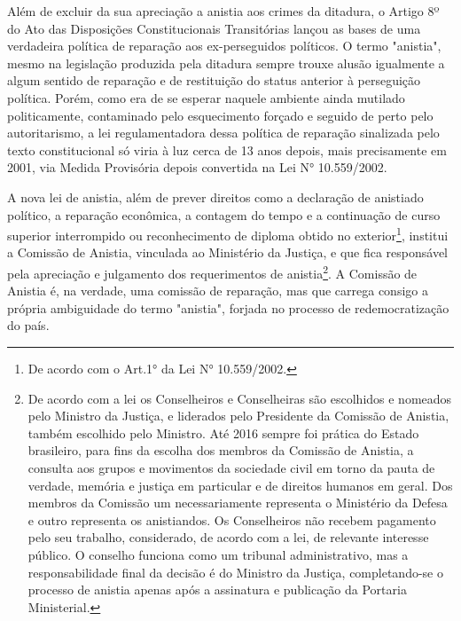 Além de excluir da sua apreciação a anistia aos crimes da ditadura, o
Artigo 8º do Ato das Disposições Constitucionais Transitórias lançou as
bases de uma verdadeira política de reparação aos ex-perseguidos
políticos. O termo "anistia", mesmo na legislação produzida pela
ditadura sempre trouxe alusão igualmente a algum sentido de reparação e
de restituição do status anterior à perseguição política. Porém, como
era de se esperar naquele ambiente ainda mutilado politicamente,
contaminado pelo esquecimento forçado e seguido de perto pelo
autoritarismo, a lei regulamentadora dessa política de reparação
sinalizada pelo texto constitucional só viria à luz cerca de 13 anos
depois, mais precisamente em 2001, via Medida Provisória depois
convertida na Lei N° 10.559/2002.

A nova lei de anistia, além de prever direitos como a declaração de
anistiado político, a reparação econômica, a contagem do tempo e a
continuação de curso superior interrompido ou reconhecimento de diploma
obtido no exterior\footnote{De acordo com o Art.1° da Lei N°
  10.559/2002.}, institui a Comissão de Anistia, vinculada ao Ministério
da Justiça, e que fica responsável pela apreciação e julgamento dos
requerimentos de anistia\footnote{De acordo com a lei os Conselheiros e
  Conselheiras são escolhidos e nomeados pelo Ministro da Justiça, e
  liderados pelo Presidente da Comissão de Anistia, também escolhido
  pelo Ministro. Até 2016 sempre foi prática do Estado brasileiro, para
  fins da escolha dos membros da Comissão de Anistia, a consulta aos
  grupos e movimentos da sociedade civil em torno da pauta de verdade,
  memória e justiça em particular e de direitos humanos em geral. Dos
  membros da Comissão um necessariamente representa o Ministério da
  Defesa e outro representa os anistiandos. Os Conselheiros não recebem
  pagamento pelo seu trabalho, considerado, de acordo com a lei, de
  relevante interesse público. O conselho funciona como um tribunal
  administrativo, mas a responsabilidade final da decisão é do Ministro
  da Justiça, completando-se o processo de anistia apenas após a
  assinatura e publicação da Portaria Ministerial.}. A Comissão de
Anistia é, na verdade, uma comissão de reparação, mas que carrega
consigo a própria ambiguidade do termo "anistia", forjada no processo de
redemocratização do país.

